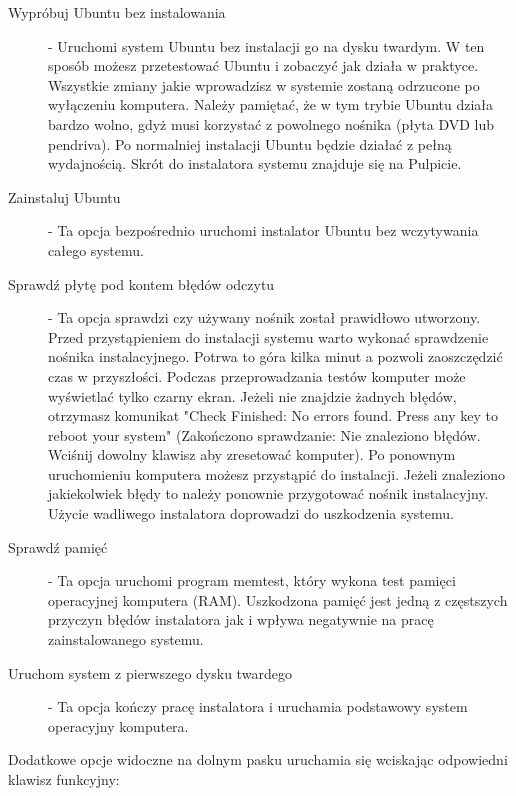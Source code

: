 \begin{description}
\item[Wypróbuj Ubuntu bez instalowania] - Uruchomi system Ubuntu bez instalacji go na dysku twardym. W ten sposób możesz przetestować Ubuntu i zobaczyć jak działa w praktyce. Wszystkie zmiany jakie wprowadzisz w systemie zostaną odrzucone po wyłączeniu komputera. Należy pamiętać, że w tym trybie Ubuntu działa bardzo wolno, gdyż musi korzystać z powolnego nośnika (płyta DVD lub pendriva). Po normalniej instalacji Ubuntu będzie działać z pełną wydajnością. Skrót do instalatora systemu znajduje się na Pulpicie.
\item[Zainstaluj Ubuntu] - Ta opcja bezpośrednio uruchomi instalator Ubuntu bez wczytywania całego systemu.
\item[Sprawdź płytę pod kontem błędów odczytu] - Ta opcja sprawdzi czy używany nośnik został prawidłowo utworzony.\\
Przed przystąpieniem do instalacji systemu warto wykonać sprawdzenie nośnika instalacyjnego. Potrwa to góra kilka minut a pozwoli zaoszczędzić czas w przyszłości. Podczas przeprowadzania testów komputer może wyświetlać tylko czarny ekran. Jeżeli nie znajdzie żadnych błędów, otrzymasz komunikat "Check Finished: No errors found. Press any key to reboot your system" (Zakończono sprawdzanie: Nie znaleziono błędów. Wciśnij dowolny klawisz aby zresetować komputer). Po ponownym uruchomieniu komputera możesz przystąpić do instalacji. Jeżeli znaleziono jakiekolwiek błędy to należy ponownie przygotować nośnik instalacyjny. Użycie wadliwego instalatora doprowadzi do uszkodzenia systemu. 
\item[Sprawdź pamięć] - Ta opcja uruchomi program memtest, który wykona test pamięci operacyjnej komputera (RAM). Uszkodzona pamięć jest jedną z częstszych przyczyn błędów instalatora jak i wpływa negatywnie na pracę zainstalowanego systemu.
\item[Uruchom system z pierwszego dysku twardego] - Ta opcja kończy pracę instalatora i uruchamia podstawowy system operacyjny komputera.
\end{description}
Dodatkowe opcje widoczne na dolnym pasku uruchamia się wciskając odpowiedni klawisz funkcyjny:
